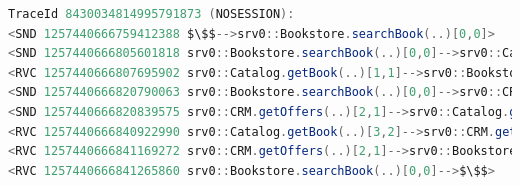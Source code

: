 \begin{lstlisting}[language=Java, float=*, numbers=none, xleftmargin=0pt, caption=Kieker.Tpan output of message trace representation, label=lst:ExecutionRecordMonitoringLogMessageTrace, basicstyle=\ttfamily\scriptsize]
TraceId 8430034814995791873 (NOSESSION):
<SND 1257440666759412388 $\$$-->srv0::Bookstore.searchBook(..)[0,0]>
<SND 1257440666805601818 srv0::Bookstore.searchBook(..)[0,0]-->srv0::Catalog.getBook(..)[1,1]>
<RVC 1257440666807695902 srv0::Catalog.getBook(..)[1,1]-->srv0::Bookstore.searchBook(..)[0,0]>
<SND 1257440666820790063 srv0::Bookstore.searchBook(..)[0,0]-->srv0::CRM.getOffers(..)[2,1]>
<SND 1257440666820839575 srv0::CRM.getOffers(..)[2,1]-->srv0::Catalog.getBook(..)[3,2]>
<RVC 1257440666840922990 srv0::Catalog.getBook(..)[3,2]-->srv0::CRM.getOffers(..)[2,1]>
<RVC 1257440666841169272 srv0::CRM.getOffers(..)[2,1]-->srv0::Bookstore.searchBook(..)[0,0]>
<RVC 1257440666841265860 srv0::Bookstore.searchBook(..)[0,0]-->$\$$>
\end{lstlisting}

